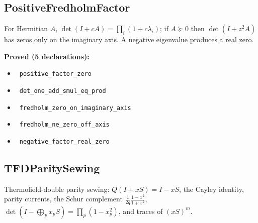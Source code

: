 \documentclass{report}
\theoremstyle{definition}
\begin{document}
\subsection{PositiveFredholmFactor}
For Hermitian $A$, $\det(I+cA)=\prod_i(1+c\lambda_i)$; if $A\succeq0$ then $\det(I+z^2A)$ has zeros only on the imaginary axis. A negative eigenvalue produces a real zero.

\noindent\textbf{Proved (5 declarations):}
\begin{itemize}
  \item {}\leanok\ \texttt{positive\_factor\_zero}
  \item {}\leanok\ \texttt{det\_one\_add\_smul\_eq\_prod}
  \item {}\leanok\ \texttt{fredholm\_zero\_on\_imaginary\_axis}
  \item {}\leanok\ \texttt{fredholm\_ne\_zero\_off\_axis}
  \item {}\leanok\ \texttt{negative\_factor\_real\_zero}
\end{itemize}

\subsection{TFDParitySewing}
Thermofield-double parity sewing: $Q(I+xS)=I-xS$, the Cayley identity, parity currents, the Schur complement $\tfrac1{2q}\tfrac{1-x^2}{1+x^2}$, $\det(I-\bigoplus_p x_pS)=\prod_p(1-x_p^2)$, and traces of $(xS)^m$.
\end{document}
